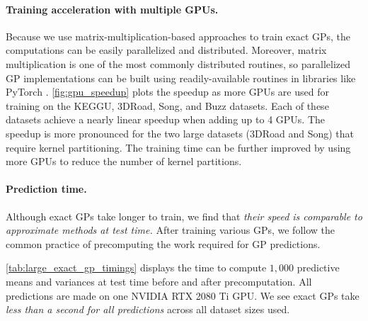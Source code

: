 \paragraph{Training acceleration with multiple GPUs.}
Because we use matrix-multiplication-based approaches to train exact GPs, the computations can be easily parallelized and distributed.
Moreover, matrix multiplication is one of the most commonly distributed routines, so parallelized GP implementations can be built using readily-available routines in libraries like PyTorch \citep{paszke2017automatic}.
\cref{fig:gpu_speedup} plots the speedup as more GPUs are used for training on the KEGGU, 3DRoad, Song, and Buzz datasets.
Each of these datasets achieve a nearly linear speedup when adding up to 4 GPUs.
The speedup is more pronounced for the two large datasets (3DRoad and Song) that require kernel partitioning.
The training time can be further improved by using more GPUs to reduce the number of kernel partitions.

\paragraph{Prediction time.}
Although exact GPs take longer to train, we find that \emph{their speed is comparable to approximate methods at test time.}
After training various GPs, we follow the common practice of precomputing the work required for GP predictions.

\cref{tab:large_exact_gp_timings} displays the time to compute $1,\!000$ predictive means and variances at test time before and after precomputation.
All predictions are made on one NVIDIA RTX 2080 Ti GPU. We see exact GPs take \emph{less than a second for all predictions} across all
dataset sizes used.
%
